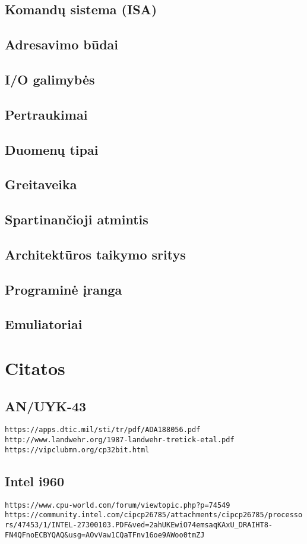 \documentclass{article}
\begin{document}
\subsection{Komandų sistema (ISA)}
\subsection{Adresavimo būdai}
\subsection{I/O galimybės}
\subsection{Pertraukimai}
\subsection{Duomenų tipai}
\subsection{Greitaveika}
\subsection{Spartinančioji atmintis}
\subsection{Architektūros taikymo sritys}
\subsection{Programinė įranga}
\subsection{Emuliatoriai}
\section{Citatos}
\subsection{AN/UYK-43}
\verb|https://apps.dtic.mil/sti/tr/pdf/ADA188056.pdf|
\\
\verb|http://www.landwehr.org/1987-landwehr-tretick-etal.pdf|
\\
\verb|https://vipclubmn.org/cp32bit.html|

\subsection{Intel i960}
\verb|https://www.cpu-world.com/forum/viewtopic.php?p=74549|
\\
\verb|https://community.intel.com/cipcp26785/attachments/cipcp26785/processors/47453/1/INTEL-27300103.PDF&ved=2ahUKEwiO74emsaqKAxU_DRAIHT8-FN4QFnoECBYQAQ&usg=AOvVaw1CQaTFnv16oe9AWoo0tmZJ|
\end{document}
